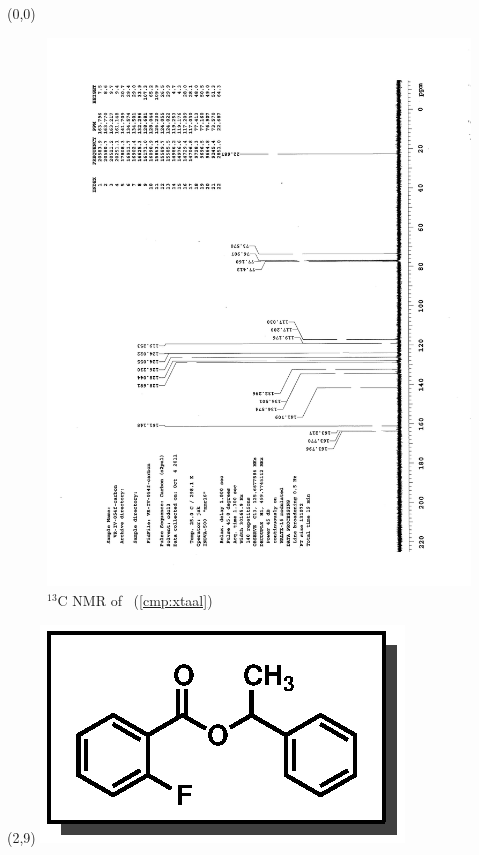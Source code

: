 \clearpage
\begin{textblock}{20}(0,0)
\begin{figure}[htb]
\caption{$^{13}$C NMR of  \CMPxtaal\ (\ref{cmp:xtaal})}
\includegraphics[scale=0.75, trim = 0mm 0mm 0mm 5mm,
clip]{chp_asymmetric/images/nmr/xtaalC}
\vspace{-100pt}
\end{figure}
\end{textblock}
\begin{textblock}{1}(2,9)
\includegraphics[scale=0.8, angle=90]{chp_asymmetric/images/xtaal}
\end{textblock}
